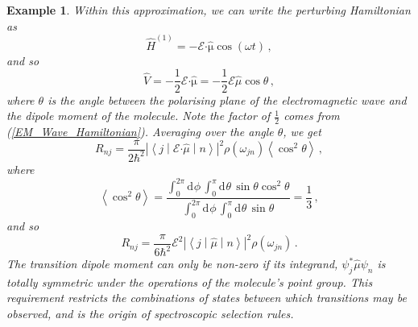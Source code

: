 \documentclass{article}
\theoremstyle{plain}\theoremheaderfont{\normalfont\itshape}\theorembodyfont{\rmfamily}\theoremseparator{.}\newtheorem*{rem}{Remark}\newtheorem*{ex}{Example}\newtheorem*{proof}{Proof}\newtheorem*{altp}{Alternative proof}
\theoremstyle{plain}\theoremheaderfont{\normalfont\bfseries}\theorembodyfont{\rmfamily}\theoremseparator{.}\newtheorem{thm}{Theorem}[section]\newtheorem{lem}[thm]{Lemma}\newtheorem{prop}[thm]{Proposition}\newtheorem*{cor}{Corollary}\newtheorem{defn}[thm]{Definition}\newtheorem{clm}[thm]{Claim}\newtheorem{clminproof}{Claim}
\theoremstyle{break}\theoremheaderfont{\normalfont\itshape}\theorembodyfont{\rmfamily}\theoremseparator{.\medskip}\newtheorem*{proofskip}{Proof}\newtheorem*{exs}{Examples}\newtheorem*{rems}{Remarks}
\theoremstyle{break}\theoremheaderfont{\normalfont\bfseries}\theorembodyfont{\rmfamily}\theoremseparator{.\medskip}\newtheorem{lemskip}[thm]{Lemma}\newtheorem{defnskip}[thm]{Definition}\newtheorem{propskip}[thm]{Proposition}\newtheorem{thmskip}[thm]{Theorem}
\numberwithin{equation}{section}
\newcommand{\dd}[2][]{\mathrm{d}^{#1} #2\,}
\newcommand{\mel}[3]{\left\langle #1 \middle| #2 \middle| #3 \right\rangle}
\newcommand{\eval}[1]{\left\langle #1 \right\rangle}
\newcommand{\vb}[1]{\bm{\mathrm{#1}}}
\newcommand{\vdot}{\bm{\cdot}}
\newcommand{\abs}[1]{\left| #1 \right|}
\begin{document}
\begin{ex}
        Within this approximation, we can write the perturbing Hamiltonian as
        \begin{equation}
            \hat{H}^{(1)}=-\vb{\mathcal{E}}\vdot\hat{\vb{\mu}}\cos(\omega t)\,,
        \end{equation}
        and so
        \begin{equation}
            \hat{V}=-\frac{1}{2}\vb{\mathcal{E}}\vdot\hat{\vb{\mu}}=-\frac{1}{2}\mathcal{E}\hat{\mu}\cos\theta\,,
        \end{equation}
        where \(\theta\) is the angle between the polarising plane of the electromagnetic wave and the dipole moment of the molecule. Note the factor of \(\frac{1}{2}\) comes from (\ref{EM_Wave_Hamiltonian}). Averaging over the angle \(\theta\), we get
        \begin{equation}
            R_{nj}=\frac{\pi}{2\hbar^2}\abs{\mel{j}{\mathcal{E}\vdot\hat{\mu}}{n}}^2\rho(\omega_{jn})\eval{\cos^2\theta}\,,
        \end{equation}
        where
        \begin{equation}
            \eval{\cos^2\theta}=\frac{\int_{0}^{2\pi}\dd{\phi}\int_{0}^{\pi}\dd{\theta}\sin\theta\cos^2\theta}{\int_{0}^{2\pi}\dd{\phi}\int_{0}^{\pi}\dd{\theta}\sin\theta}=\frac{1}{3}\,,
        \end{equation}
        and so
        \begin{equation}
            R_{nj}=\frac{\pi}{6\hbar^2}\mathcal{E}^2\abs{\mel{j}{\hat{\mu}}{n}}^2\rho(\omega_{jn})\,.
        \end{equation}
        The transition dipole moment can only be non-zero if its integrand, \(\psi_j^*\hat{\mu}\psi_n\) is totally symmetric under the operations of the molecule's point group. This requirement restricts the combinations of states between which transitions may be observed, and is the origin of spectroscopic selection rules.


\end{ex}
\end{document}
